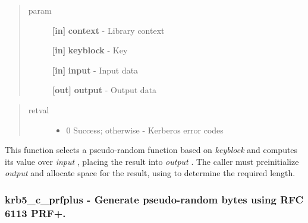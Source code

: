 \documentclass[letterpaper,10pt,english]{sphinxmanual}
\begin{document}
\begin{quote}\begin{description}
\item[{param}] \leavevmode
\textbf{{[}in{]}} \textbf{context} - Library context

\textbf{{[}in{]}} \textbf{keyblock} - Key

\textbf{{[}in{]}} \textbf{input} - Input data

\textbf{{[}out{]}} \textbf{output} - Output data

\end{description}\end{quote}
\begin{quote}\begin{description}
\item[{retval}] \leavevmode\begin{itemize}
\item {} 
0   Success; otherwise - Kerberos error codes

\end{itemize}

\end{description}\end{quote}

This function selects a pseudo-random function based on \emph{keyblock} and computes its value over \emph{input} , placing the result into \emph{output} . The caller must preinitialize \emph{output} and allocate space for the result, using {\hyperref[appdev/refs/api/krb5_c_prf_length:c.krb5_c_prf_length]{}} to determine the required length.


\subsubsection{krb5\_c\_prfplus -  Generate pseudo-random bytes using RFC 6113 PRF+.}
\label{appdev/refs/api/krb5_c_prfplus:krb5-c-prfplus-generate-pseudo-random-bytes-using-rfc-6113-prf}\label{appdev/refs/api/krb5_c_prfplus::doc}

\begin{fulllineitems}
\label{appdev/refs/api/krb5_c_prfplus:c.krb5_c_prfplus}
\end{fulllineitems}
\end{document}
